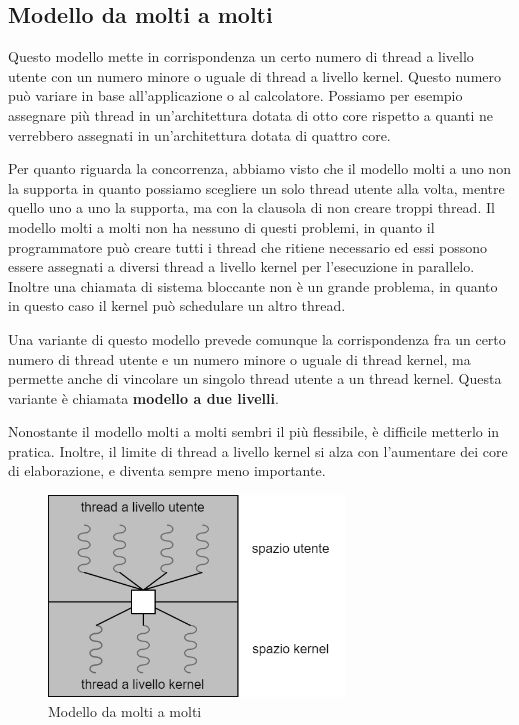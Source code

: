         \subsection{Modello da molti a molti}
            Questo modello mette in corrispondenza un certo numero di thread a livello utente con un numero minore o uguale di thread a livello kernel. Questo numero può variare in base all'applicazione o al calcolatore. Possiamo per esempio assegnare più thread in un'architettura dotata di otto core rispetto a quanti ne verrebbero assegnati in un'architettura dotata di quattro core.
            
            Per quanto riguarda la concorrenza, abbiamo visto che il modello molti a uno non la supporta in quanto possiamo scegliere un solo thread utente alla volta, mentre quello uno a uno la supporta, ma con la clausola di non creare troppi thread. Il modello molti a molti non ha nessuno di questi problemi, in quanto il programmatore può creare tutti i thread che ritiene necessario ed essi possono essere assegnati a diversi thread a livello kernel per l'esecuzione in parallelo. Inoltre una chiamata di sistema bloccante non è un grande problema, in quanto in questo caso il kernel può schedulare un altro thread.
            
            Una variante di questo modello prevede comunque la corrispondenza fra un certo numero di thread utente e un numero minore o uguale di thread kernel, ma permette anche di vincolare un singolo thread utente a un thread kernel. Questa variante è chiamata \textbf{modello a due livelli}.
            
            Nonostante il modello molti a molti sembri il più flessibile, è difficile metterlo in pratica. Inoltre, il limite di thread a livello kernel si alza con l'aumentare dei core di elaborazione, e diventa sempre meno importante.
            
            \begin{figure}[h]
                \centering
                \includegraphics[width=0.7\textwidth]{img/thread4.png}
                \caption{Modello da molti a molti}
                \label{fig:my_label}
            \end{figure}
            
